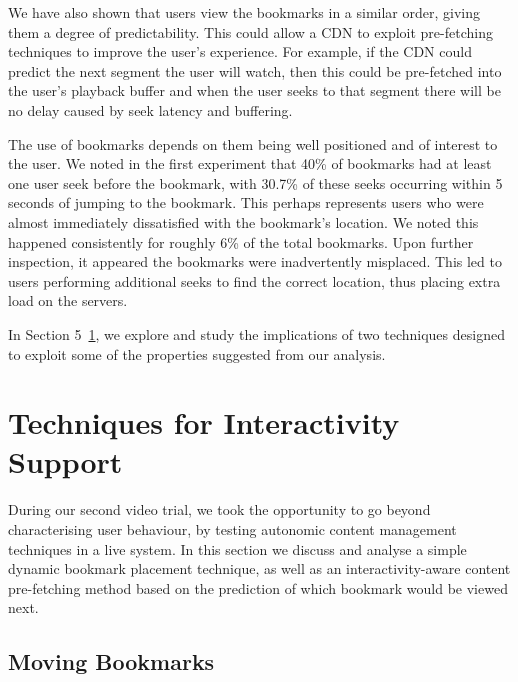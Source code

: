 \documentclass[a4paper,11pt]{article}
\begin{document}
We have also shown that users view the bookmarks in a similar order, giving them a degree of predictability. This could allow a CDN to exploit pre-fetching techniques to improve the user's experience. For example, if the CDN could predict the next segment the user will watch, then this could be pre-fetched into the user's playback buffer and when the user seeks to that segment there will be no delay caused by seek latency and buffering.

The use of bookmarks depends on them being well positioned and of interest to the user. We noted in the first experiment that 40\% of bookmarks had at least one user seek before the bookmark, with 30.7\% of these seeks occurring within 5 seconds of jumping to the bookmark. This perhaps represents users who were almost immediately dissatisfied with the bookmark's location. We noted this happened consistently for roughly 6\% of the total bookmarks. Upon further inspection, it appeared the bookmarks were inadvertently misplaced. This led to users performing additional seeks to find the correct location, thus placing extra load on the servers.

In Section 5~\ref{sect:new_techiques}, we explore and study the implications of two techniques designed to exploit some of the properties suggested from our analysis. %

\section{Techniques for Interactivity Support}
\label{sect:new_techiques}


During our second video trial, we took the opportunity to go beyond characterising user behaviour, by testing autonomic content management techniques in a live system. In this section we discuss and analyse a simple dynamic bookmark placement technique, as well as an interactivity-aware content pre-fetching method based on the prediction of which bookmark would be viewed next.

\subsection{Moving Bookmarks}
\label{sect:moving_bookmark}
\end{document}
